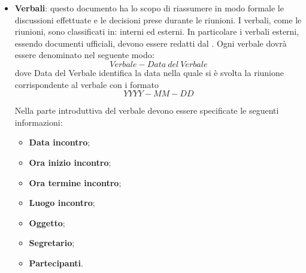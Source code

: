 \documentclass[../NormeDiProgetto_v3.0.0.tex]{subfiles}
\begin{document}
\begin{itemize}
				\item \textbf{Verbali}: questo documento ha lo scopo di riassumere in modo formale le discussioni effettuate e le decisioni prese durante le riunioni. I verbali, come le riunioni, sono classificati in: interni ed esterni. In particolare i verbali esterni, essendo documenti ufficiali, devono essere redatti dal \responsabilediprogetto.
				Ogni verbale dovrà essere denominato nel seguente modo:
				\begin{equation*}
					Verbale-Data\ del\ Verbale
				\end{equation*}
				dove Data del Verbale identifica la data nella quale si è svolta la riunione corrispondente al verbale con i formato
				\begin{equation*}
					YYYY-MM-DD
				\end{equation*}

				Nella parte introduttiva del verbale devono essere specificate le seguenti informazioni:
					\begin{itemize}
					\item \textbf{Data incontro};
					\item \textbf{Ora inizio incontro};
					\item \textbf{Ora termine incontro};
					\item \textbf{Luogo incontro};
					\item \textbf{Oggetto};
					\item \textbf{Segretario};
					\item \textbf{Partecipanti}.
					\end{itemize}
				\end{itemize}
			
\end{document}
